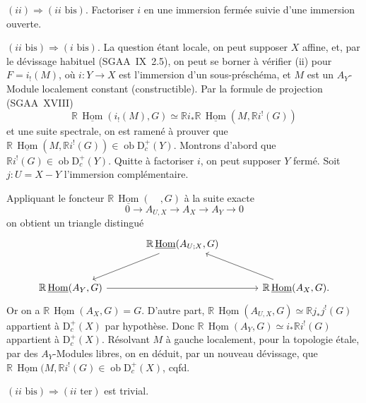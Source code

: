 \documentclass[11pt]{article}
\DeclareMathOperator{\Hom}{Hom}
\newcommand{\R}{\mathbb{R}}\newcommand{\RHomCore}{\mathbb{R}\mathrm{Hom}}
\newcommand{\D}{\mathrm{D}}
\newcommand{\ob}{\operatorname{ob}}
\providecommand{\Hom}{\operatorname{Hom}}
\providecommand{\ob}{\operatorname{ob}}
\providecommand{\R}{\mathrm R}
\providecommand{\Hom}{\operatorname{Hom}}
\begin{document}
$(ii) \Rightarrow (ii\text{~bis})$. Factoriser $i$ en une immersion fermée suivie d'une immersion ouverte.

$(ii\text{~bis}) \Rightarrow (i\text{~bis})$. La question étant locale, on peut supposer $X$ affine, et, par le dévissage habituel (SGAA~IX~2.5), on peut se borner à vérifier (ii) pour $F = i_{!}(M)$, où $i : Y \to X$ est l'immersion d'un sous-préschéma, et $M$ est un $A_Y$-Module localement constant (constructible). Par la formule 
de
projection (SGAA~XVIII)
\[
\R\,\underline{\Hom}(i_{!}(M), G) \simeq \R i_{*} \R\,\underline{\Hom}(M, \R i^{!}(G))
\]
et une suite spectrale, on est ramené à prouver que $\R\,\underline{\Hom}(M, \R i^{!}(G)) \in \ob \D_c^{+}(Y)$. Montrons d'abord que $\R i^{!}(G) \in \ob \D_c^{+}(Y)$. Quitte à factoriser $i$, on peut supposer $Y$ fermé. Soit $j : U = X - Y$ l'immersion complémentaire.

Appliquant le foncteur $\R\,\underline{\Hom}(\quad, G)$ à la suite exacte
\[
0 \longrightarrow A_{U,X} \longrightarrow A_X \longrightarrow A_Y \longrightarrow 0
\]
on obtient un triangle distingué
\[
\begin{tikzcd}[column sep=large,row sep=large]
& \R\,\underline{\Hom}(A_{U;X}, G) \arrow[dl] & \\
\R\,\underline{\Hom}(A_Y, G) \arrow[rr] & & \R\,\underline{\Hom}(A_X, G). \arrow[ul]
\end{tikzcd}
\]
Or on a $\R\,\underline{\Hom}(A_X, G) = G$. D'autre part, $\R\,\underline{\Hom}(A_{U,X}, G) \simeq \R j_{*} j^{!}(G)$ appartient à $\D_c^{+}(X)$ par hypothèse. Donc $\R\,\underline{\Hom}(A_Y, G) \simeq i_{*} \R i^{!}(G)$ appartient à $\D_c^{+}(X)$. Résolvant $M$ à gauche localement, pour la topologie étale, par des $A_Y$-Modules libres, on en déduit, par un nouveau dévissage, que $\R\,\underline{\Hom}(M, \R i^{!}(G) \in \ob \D_c^{+}(X)$, cqfd.

$(ii\text{~bis}) \Rightarrow (ii\text{~ter})$ est trivial.
\end{document}
